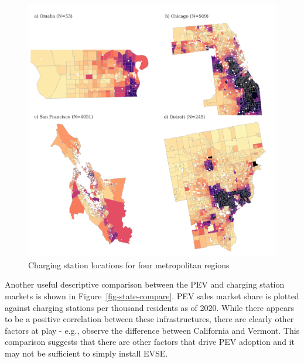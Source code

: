 \documentclass[
  letterpaper,
  DIV=11,
  numbers=noendperiod]{scrartcl}
\begin{document}
\begin{figure}

{\centering \includegraphics{TRB_2023_files/figure-pdf/fig-equity-output-1.png}

}

\caption{\label{fig-equity}Charging station locations for four
metropolitan regions}

\end{figure}

Another useful descriptive comparison between the PEV and charging
station markets is shown in Figure~\ref{fig-state-compare}. PEV sales
market share is plotted against charging stations per thousand residents
as of 2020. While there appears to be a positive correlation between
these infrastructures, there are clearly other factors at play - e.g.,
observe the difference between California and Vermont. This comparison
suggests that there are other factors that drive PEV adoption and it may
not be sufficient to simply install EVSE.
\end{document}
